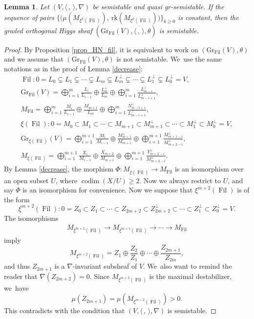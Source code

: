\documentclass[JEP,XML,SOM,Unicode,published]{cedram}
\newcommand{\grsemistable}{gr\nobreakdash-semi\-stable\xspace}
\DeclareMathOperator{\codim}{codim}
\DeclareMathOperator{\Filt}{Fil}
\newcommand{\rk}{\mathrm{rk}}
\newcommand{\Gr}{\mathrm{Gr}}
\theoremstyle{plain}
\newtheorem{lem}[thm]{Lemma}
\theoremstyle{definition}
\begin{document}
\begin{lem}\label{lem_const}
Let $(V, \langle \,, \, \rangle, \nabla)$ be semistable and quasi \grsemistable. If the sequence of pairs $\{\big(\mu(M_{\xi^k(\Filt)}),\ \rk(M_{\xi^k(\Filt)})\big)\}_{k\geq 0}$ is constant, then the graded orthogonal Higgs sheaf $(\Gr_{\Filt}(V), \overline{\langle \,, \, \rangle}, \theta)$ is semistable.
\end{lem}

\begin{proof}
By Proposition \ref{prop_HN_fil}, it is equivalent to work on $(\Gr_{\Filt}(V), \theta)$ and we assume that $(\Gr_{\Filt}(V), \theta)$ is not semistable. We~use the same notations as in the proof of Lemma \ref{decrease}:
\begin{gather*}
\Filt: 0= L_0 \subsetneq L_1 \subsetneq \cdots \subsetneq L_m \subsetneq L_m^\perp\subsetneq\cdots \subsetneq L_1^\perp\subsetneq L_0^\perp= V,
\\
\Gr_{\Filt}(V)=\mathop{\bigoplus}_{i=1}^{m} \frac{L_i}{L_{i-1}}\oplus \frac{L_m^\perp}{L_m}\oplus \mathop{\bigoplus}_{i=1}^{m} \frac{L_{m-i}^\perp}{L_{m-i+1}^\perp},
\\
M_{\Filt}=\mathop{\bigoplus}_{i=1}^{m} \frac{M_i}{L_{i-1}}\oplus \frac{M_{m+1}}{L_m}\oplus \mathop{\bigoplus}_{i=1}^{m} \frac{N_{m-i+1}^\perp}{L_{m-i+1}^\perp},
\\
\xi(\Filt):0=M_0\subset M_1\subset\cdots\subset M_{m+1}\subset M_{m+1}^\perp\subset\cdots\subset M_1^\perp\subset M_0^\perp=V,
\\
\Gr_{\xi(\Filt)}(V)=\mathop{\bigoplus}_{i=1}^{m+1} \frac{M_i}{M_{i-1}}\oplus \frac{M_{m+1}^\perp}{M_{m+1}}\oplus \mathop{\bigoplus}_{i=1}^{m+1} \frac{M_{m+1-i}^\perp}{M_{m+2-i}^\perp},
\\
M_{\xi(\Filt)}=\mathop{\bigoplus}_{i=1}^{m+1} \frac{X_i}{M_{i-1}}\oplus \frac{X_{m+2}}{M_{m+1}}\oplus \mathop{\bigoplus}_{i=1}^{m+1} \frac{Y_{m+2-i}^\perp}{M_{m+2-i}^\perp}.
\end{gather*}
By Lemma \ref{decrease}, the morphism $\Phi:M_{\xi(\Filt)}\to M_{\Filt}$ is an isomorphism over an open subset $U$, where $\codim(X/U) \geq 2$. Now we always restrict to $U$, and say $\Phi$ is an isomorphism for convenience. Now we suppose that $\xi^{m+2}(\Filt)$ is of the form
\[
\xi^{m+2}(\Filt): 0= Z_0 \subset Z_1 \subset \cdots \subset Z_{2m+2}\subset Z_{2m+2}^\perp\subset\cdots \subset Z_1^\perp\subset Z_0^\perp= V.
\]
The isomorphisms
\begin{align*}
M_{\xi^{m+2}(\Filt)} \to M_{\xi^{m+1}(\Filt)} \to \cdots \to M_{\Filt}
\end{align*}
imply
\[
M_{\xi^{m+2}(\Filt)}=Z_1\oplus \frac{Z_2}{Z_1}\oplus\cdots\oplus \frac{Z_{2m+1}}{Z_{2m}},
\]
and thus $Z_{2m+1}$ is a $\nabla$-invariant subsheaf of $V$. We~also want to remind the reader that $\nabla(Z_{2m+2}) = 0$. Since $M_{\xi^{m+2}(\Filt)}$ is the maximal destabilizer, we~have
\[
\mu(Z_{2m+1})=\mu(M_{\xi^{m+2}(\Filt)})>0.
\]
This contradicts with the condition that $(V,\langle \,, \, \rangle,\nabla)$ is semistable.
\end{proof}
\end{document}
